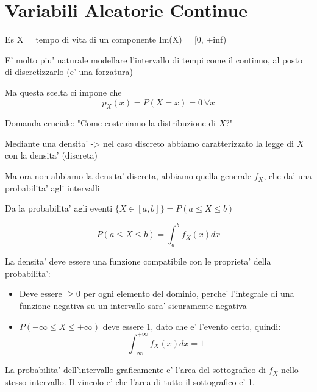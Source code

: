 \section{Variabili Aleatorie Continue}

Es X = tempo di vita di un componente Im(X) = [0, +inf)

E' molto piu' naturale modellare l'intervallo di tempi come il continuo, al posto di discretizzarlo (e' una forzatura)

Ma questa scelta ci impone che
\[
  p_X(x) = P(X = x) = 0 \ \forall x
\]

Domanda cruciale: "Come costruiamo la distribuzione di $ X $?"

Mediante una densita' -> nel caso discreto abbiamo caratterizzato la legge di $ X $ con la densita' (discreta)

Ma ora non abbiamo la densita' discreta, abbiamo quella generale $ f_X $, che da' una probabilita' agli intervalli

Da la probabilita' agli eventi $ \{X \in [a,b]\}  = P(a\leq X \leq b) $

\[
  P(a \leq X \leq b) = \int_{a}^{b} f_X(x)dx
\]

La densita' deve essere una funzione compatibile con le proprieta' della probabilita':
\begin{itemize}
\item Deve essere $ \geq 0 $ per ogni elemento del dominio, perche' l'integrale di una funzione negativa su un intervallo sara' sicuramente negativa
\item $ P(-\infty \leq X \leq +\infty) $ deve essere 1, dato che e' l'evento certo, quindi:
  \[
    \int_{-\infty}^{+\infty}f_X(x)dx = 1
  \]
\end{itemize}


La probabilita' dell'intervallo graficamente e' l'area del sottografico di $ f_X $ nello stesso intervallo. Il vincolo e' che l'area di tutto il sottografico e' 1.


